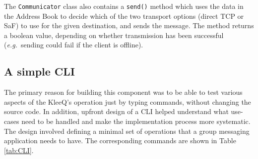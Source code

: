 \documentclass[a4paper, twoside, 12pt]{report}
\begin{document}
The \texttt{Communicator} class also contains a \texttt{send()} method which uses the data in the Address Book to decide which of the two transport options (direct TCP or SaF) to use for the given destination, and sends the message. The method returns a boolean value, depending on whether transmission has been successful (\textit{e.g.}~sending could fail if the client is offline).


\subsection{A simple CLI}
\label{subsec:impl.prep.CLI}
The primary reason for building this component was to be able to test various aspects of the KleeQ's operation just by typing commands, without changing the source code. In addition, upfront design of a CLI helped understand what use-cases need to be handled and make the implementation process more systematic. \\

The design involved defining a minimal set of operations that a group messaging application needs to have. The corresponding commands are shown in Table \ref{tab:CLI}.
\end{document}
